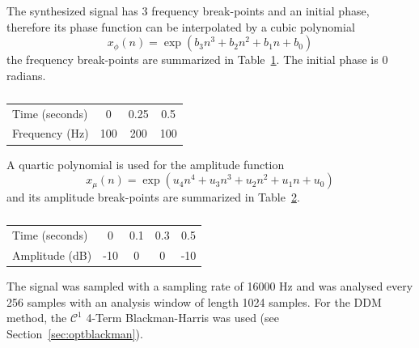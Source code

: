 The synthesized signal has 3 frequency break-points and an initial phase,
therefore its phase function can be interpolated by a cubic polynomial
\[
    x_{\phi}(n) = \exp \left(b_3 n^{3} + b_2 n^{2} + b_1 n + b_0 \right)
\]
the frequency break-points are summarized in Table~\ref{tab:cubicsinphparams}. The
initial phase is $0$ radians.

\begin{table}
    \caption{\label{tab:cubicsinphparams}}
    \begin{center}
        \begin{tabular}{l|c c c}
            Time (seconds) & 0 & 0.25 & 0.5 \\
            Frequency (Hz) & 100 & 200 & 100
        \end{tabular}
    \end{center}
\end{table}

A quartic polynomial is used for the amplitude function
\[
    x_{\mu}(n) = \exp \left(u_4 n^{4} + u_3 n^{3} + u_2 n^{2} + u_1 n + u_0 \right)
\]
and its amplitude break-points are summarized in
Table~\ref{tab:quarticsinampparams}.

\begin{table}
    \caption{\label{tab:quarticsinampparams}}
    \begin{center}
        \begin{tabular}{l|c c c c}
            Time (seconds) & 0 & 0.1 & 0.3 & 0.5 \\
            Amplitude (dB) & -10 & 0 & 0 & -10
        \end{tabular}
    \end{center}
\end{table}

The signal was sampled with a sampling rate of 16000 Hz and was analysed every
256 samples with an analysis window of length 1024 samples. For the DDM method, the
$\mathcal{C}^{1}$ 4-Term Blackman-Harris was used (see
Section~\ref{sec:optblackman}).

